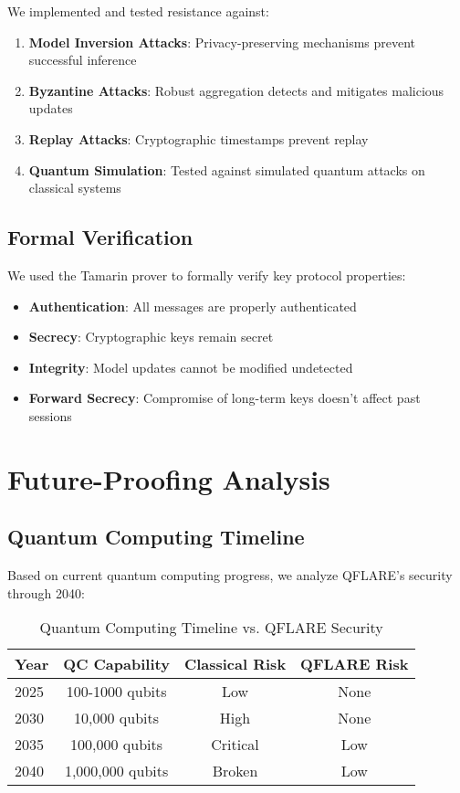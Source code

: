 \documentclass[journal]{IEEEtran}
\begin{document}
We implemented and tested resistance against:

\begin{enumerate}
\item \textbf{Model Inversion Attacks}: Privacy-preserving mechanisms prevent successful inference
\item \textbf{Byzantine Attacks}: Robust aggregation detects and mitigates malicious updates  
\item \textbf{Replay Attacks}: Cryptographic timestamps prevent replay
\item \textbf{Quantum Simulation}: Tested against simulated quantum attacks on classical systems
\end{enumerate}

\subsection{Formal Verification}

We used the Tamarin prover to formally verify key protocol properties:

\begin{itemize}
\item \textbf{Authentication}: All messages are properly authenticated
\item \textbf{Secrecy}: Cryptographic keys remain secret
\item \textbf{Integrity}: Model updates cannot be modified undetected
\item \textbf{Forward Secrecy}: Compromise of long-term keys doesn't affect past sessions
\end{itemize}

\section{Future-Proofing Analysis}

\subsection{Quantum Computing Timeline}

Based on current quantum computing progress, we analyze QFLARE's security through 2040:

\begin{table}[h]
\centering
\caption{Quantum Computing Timeline vs. QFLARE Security}
\begin{tabular}{|l|c|c|c|}
\hline
\textbf{Year} & \textbf{QC Capability} & \textbf{Classical Risk} & \textbf{QFLARE Risk} \\
\hline
2025 & 100-1000 qubits & Low & None \\
2030 & 10,000 qubits & High & None \\  
2035 & 100,000 qubits & Critical & Low \\
2040 & 1,000,000 qubits & Broken & Low \\
\hline
\end{tabular}
\end{table}
\end{document}
